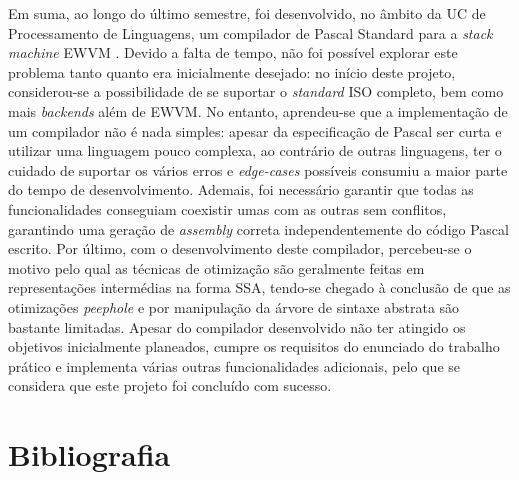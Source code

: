 \documentclass[12pt, a4paper]{article}
\begin{document}
Em suma, ao longo do último semestre, foi desenvolvido, no âmbito da UC de Processamento de
Linguagens, um compilador de Pascal Standard \cite{iso} para a \emph{stack machine} EWVM
\cite{ewvm}. Devido a falta de tempo, não foi possível explorar este problema tanto quanto era
inicialmente desejado: no início deste projeto, considerou-se a possibilidade de se suportar o
\emph{standard} ISO completo, bem como mais \emph{backends} além de EWVM. No entanto, aprendeu-se
que a implementação de um compilador não é nada simples: apesar da especificação de Pascal ser
curta e utilizar uma linguagem pouco complexa, ao contrário de outras linguagens, ter o cuidado
de suportar os vários erros e \emph{edge-cases} possíveis consumiu a maior parte do tempo de
desenvolvimento. Ademais, foi necessário garantir que todas as funcionalidades conseguiam coexistir
umas com as outras sem conflitos, garantindo uma geração de \emph{assembly} correta
independentemente do código Pascal escrito. Por último, com o desenvolvimento deste compilador,
percebeu-se o motivo pelo qual as técnicas de otimização são geralmente feitas em representações
intermédias na forma SSA, tendo-se chegado à conclusão de que as otimizações \emph{peephole} e por
manipulação da árvore de sintaxe abstrata são bastante limitadas. Apesar do compilador desenvolvido
não ter atingido os objetivos inicialmente planeados, cumpre os requisitos do enunciado do trabalho
prático e implementa várias outras funcionalidades adicionais, pelo que se considera que este
projeto foi concluído com sucesso.

\begingroup
\section{Bibliografia}
\renewcommand{\section}[2]{}
\end{document}
